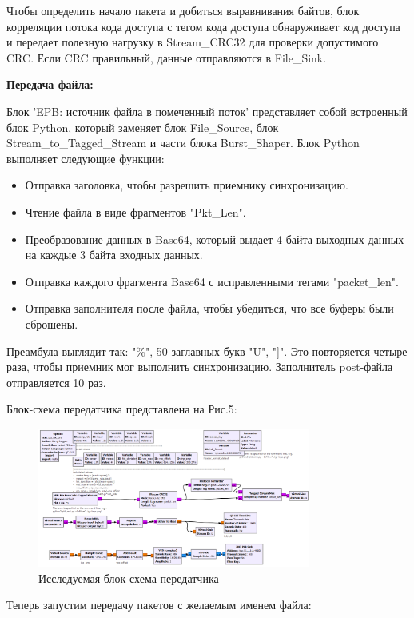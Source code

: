 \documentclass[12pt]{article}
\begin{document}
Чтобы определить начало пакета и добиться выравнивания байтов, блок корреляции потока кода доступа с тегом кода доступа обнаруживает код доступа и передает полезную нагрузку в Stream\_CRC32 для проверки допустимого CRC. Если CRC правильный, данные отправляются в File\_Sink.

\bigskip

\textbf{Передача файла:}
\medskip

Блок 'EPB: источник файла в помеченный поток' представляет собой встроенный блок Python, который заменяет блок File\_Source, блок Stream\_to\_Tagged\_Stream и части блока Burst\_Shaper. Блок Python выполняет следующие функции:
\begin{itemize}
	\item Отправка заголовка, чтобы разрешить приемнику синхронизацию.
	\item Чтение файла в виде фрагментов "Pkt\_Len".
	\item Преобразование данных в Base64, который выдает 4 байта выходных данных на каждые 3 байта входных данных.
	\item Отправка каждого фрагмента Base64 с исправленными тегами "packet\_len".
	\item Отправка заполнителя после файла, чтобы убедиться, что все буферы были сброшены.
\end{itemize}

Преамбула выглядит так: "\%", 50 заглавных букв "U", "]". Это повторяется четыре раза, чтобы приемник мог выполнить синхронизацию. Заполнитель post-файла отправляется 10 раз.

Блок-схема передатчика представлена на Рис.5:

\begin{figure}[H]
    \centering
    \includegraphics[width=0.8\textwidth]{pics/a0000-img005.png}
    \caption{Исследуемая блок-схема передатчика}
\end{figure}

Теперь запустим передачу пакетов с желаемым именем файла:
\end{document}
